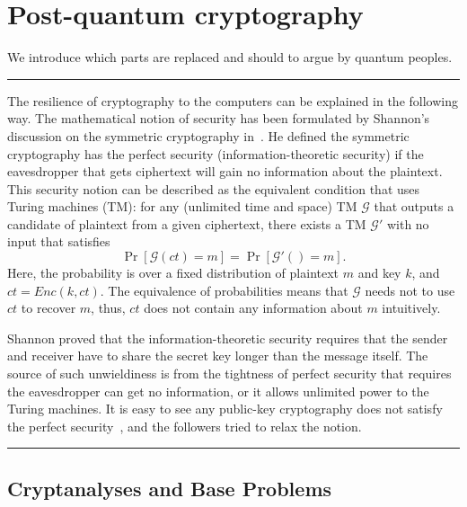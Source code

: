 


\newcommand{\memo}[1]{{\color{red} #1 }}


%
% 


\clearpage

\section{Post-quantum cryptography}


We introduce which parts are replaced and should to argue by quantum peoples.

\rule{\columnwidth}{1pt}

The resilience of cryptography to the computers can be explained in the following way.
The mathematical notion of security has been formulated by Shannon's discussion on the symmetric cryptography in~\cite{Sha49}.
He defined the symmetric cryptography has the perfect security (information-theoretic security) if the eavesdropper that gets ciphertext will gain no information about the plaintext.
This security notion can be described as the equivalent condition that 
uses Turing machines (TM):
for any (unlimited time and space) TM $\mathcal{G}$ that outputs a candidate of plaintext from a given ciphertext, there exists a TM $\mathcal{G}'$ with no input that satisfies
%
\begin{equation}
	\label{eqn:ITalg}
	\Pr[ \mathcal{G}(ct) = m ] = \Pr [\mathcal{G}'() = m ].
\end{equation}
%
Here, the probability is over a fixed distribution of plaintext $m$ and key $k$, and $ct = Enc(k,ct)$.
The equivalence of probabilities means that $\mathcal{G}$ needs not to use $ct$ to recover $m$, thus, $ct$ does not contain any information about $m$ intuitively.

Shannon proved that the information-theoretic security 
requires that the sender and receiver have to share 
the secret key longer than the message itself.
The source of such unwieldiness is from the tightness of perfect security that requires the eavesdropper can get no information, or it allows unlimited power to the Turing machines.
It is easy to see any public-key cryptography does not satisfy
the perfect security~\cite[Sect. 5.5.2]{GolEnc2}, 
and the followers tried to relax the notion.

\rule{\columnwidth}{1pt}

\subsection{Cryptanalyses and Base Problems}


